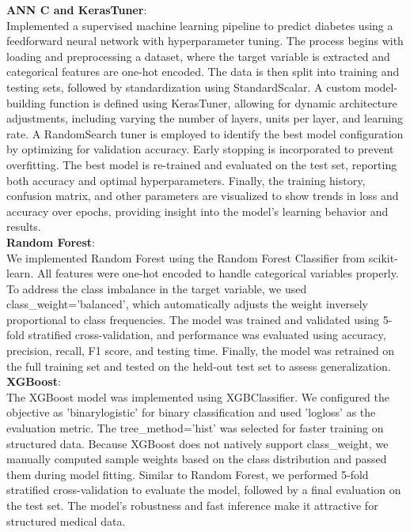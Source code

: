\documentclass[conference]{IEEEtran}
\begin{document}
\noindent
\textbf{ANN C and KerasTuner}:\\
Implemented a supervised machine learning pipeline to predict diabetes using a feedforward neural network with hyperparameter tuning. The process begins with loading and preprocessing a dataset, where the target variable is extracted and categorical features are one-hot encoded. The data is then split into training and testing sets, followed by standardization using StandardScalar. A custom model-building function is defined using KerasTuner, allowing for dynamic architecture adjustments, including varying the number of layers, units per layer, and learning rate. A RandomSearch tuner is employed to identify the best model configuration by optimizing for validation accuracy. Early stopping is incorporated to prevent overfitting. The best model is re-trained and evaluated on the test set, reporting both accuracy and optimal hyperparameters. Finally, the training history, confusion matrix, and other parameters are visualized to show trends in loss and accuracy over epochs, providing insight into the model's learning behavior and results.\\

\noindent
\textbf{Random Forest}:\\
We implemented Random Forest using the Random Forest Classifier from scikit-learn. All features were one-hot encoded to handle categorical variables properly. To address the class imbalance in the target variable, we used class\_weight='balanced', which automatically adjusts the weight inversely proportional to class frequencies. The model was trained and validated using 5-fold stratified cross-validation, and performance was evaluated using accuracy, precision, recall, F1 score, and testing time. Finally, the model was retrained on the full training set and tested on the held-out test set to assess generalization.\\

\noindent
\textbf{XGBoost}:\\
The XGBoost model was implemented using XGBClassifier. We configured the objective as 'binary\:logistic' for binary classification and used 'logloss' as the evaluation metric. The tree\_method='hist' was selected for faster training on structured data. Because XGBoost does not natively support class\_weight, we manually computed sample weights based on the class distribution and passed them during model fitting. Similar to Random Forest, we performed 5-fold stratified cross-validation to evaluate the model, followed by a final evaluation on the test set. The model's robustness and fast inference make it attractive for structured medical data.\\
\end{document}
